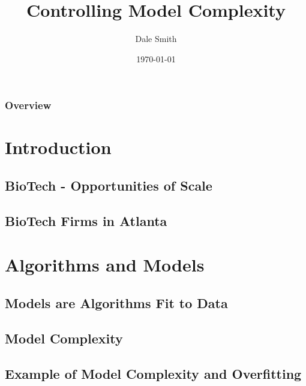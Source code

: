 \documentclass{beamer}
\title[Model Compexity]{Controlling Model Complexity} %
\author{Dale Smith} %
\institute[Consulting Data Scientist] %
{
Atlanta, GA \\ %
}
\date{\today} %
\begin{document}
\begin{frame}
\titlepage %
\end{frame}

\begin{frame}
\frametitle{Overview} %
\tableofcontents %
\end{frame}


\section{Introduction}
\subsection{BioTech - Opportunities of Scale}
\subsection{BioTech Firms in Atlanta}
\section{Algorithms and Models}
\subsection{Models are Algorithms Fit to Data}
\subsection{Model Complexity}
\subsection{Example of Model Complexity and Overfitting}
\end{document}
